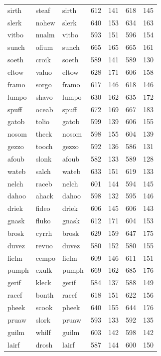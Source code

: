 \documentclass[
]{interact}
\begin{document}
\begin{longtable*}{lllrrrr}
sirth & steaf & sirth & 612 & 141 & 618 & 145 \\ 
slerk & nohew & slerk & 640 & 153 & 634 & 163 \\ 
vitbo & nualm & vitbo & 593 & 151 & 596 & 154 \\ 
sunch & ofium & sunch & 665 & 165 & 665 & 161 \\ 
soeth & croik & soeth & 589 & 141 & 589 & 130 \\ 
eltow & valuo & eltow & 628 & 171 & 606 & 158 \\ 
framo & sorgo & framo & 617 & 146 & 618 & 146 \\ 
lumpo & shavo & lumpo & 630 & 162 & 635 & 172 \\ 
spuff & oceab & spuff & 672 & 169 & 667 & 183 \\ 
gatob & tolio & gatob & 599 & 139 & 606 & 155 \\ 
nosom & theck & nosom & 598 & 155 & 604 & 139 \\ 
gezzo & tooch & gezzo & 592 & 136 & 586 & 131 \\ 
afoub & slonk & afoub & 582 & 133 & 589 & 128 \\ 
wateb & salch & wateb & 633 & 151 & 619 & 133 \\ 
nelch & raceb & nelch & 601 & 144 & 594 & 145 \\ 
dahoo & ahack & dahoo & 598 & 132 & 595 & 146 \\ 
driek & fideo & driek & 606 & 145 & 606 & 143 \\ 
gnask & fluko & gnask & 612 & 171 & 604 & 153 \\ 
brosk & cyrrh & brosk & 629 & 159 & 647 & 175 \\ 
duvez & revuo & duvez & 580 & 152 & 580 & 155 \\ 
fielm & cempo & fielm & 609 & 146 & 611 & 151 \\ 
pumph & exulk & pumph & 669 & 162 & 685 & 176 \\ 
gerif & kleck & gerif & 584 & 137 & 588 & 149 \\ 
racef & bonth & racef & 618 & 151 & 622 & 156 \\ 
pheek & scook & pheek & 640 & 155 & 644 & 176 \\ 
pruaw & slork & pruaw & 593 & 133 & 592 & 135 \\ 
guilm & whilf & guilm & 603 & 142 & 598 & 142 \\ 
lairf & drosh & lairf & 587 & 144 & 600 & 150 \\ 
\bottomrule
\end{longtable*}
\end{document}
